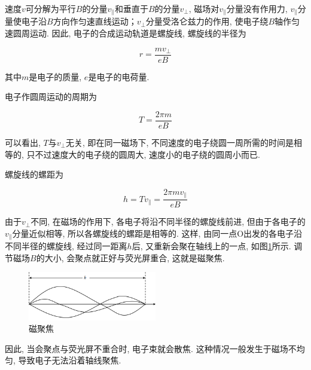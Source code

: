 \documentclass{article}
\begin{document}
速度$v$可分解为平行$B$的分量$v_{\parallel}$和垂直于$B$的分量$v_{\perp}$, 磁场对$v_{\parallel}$分量没有作用力, $v_{\parallel}$分量使电子沿$B$方向作匀速直线运动；$v_{\perp}$分量受洛仑兹力的作用, 使电子绕$B$轴作匀速圆周运动. 因此, 电子的合成运动轨道是螺旋线, 螺旋线的半径为

$$r = \frac{m v_{\perp}}{e B}$$

其中$m$是电子的质量, $e$是电子的电荷量.

电子作圆周运动的周期为

$$ T = \frac{2\pi m}{e B} $$

可以看出, $T$与$v_{\perp}$无关, 即在同一磁场下, 不同速度的电子绕圆一周所需的时间是相等的, 只不过速度大的电子绕的圆周大, 速度小的电子绕的圆周小而已.

螺旋线的螺距为

$$ h = T v_{\parallel} = \frac{2\pi m v_{\parallel}}{e B} $$

由于$v_{\perp}$不同, 在磁场的作用下, 各电子将沿不同半径的螺旋线前进, 但由于各电子的$v_{\parallel}$分量近似相等, 所以各螺旋线的螺距是相等的. 这样, 由同一点O出发的各电子沿不同半径的螺旋线, 经过同一距离$h$后, 又重新会聚在轴线上的一点, 如图\ref{fig:magnetic_focusing}所示. 调节磁场$B$的大小, 会聚点就正好与荧光屏重合, 这就是磁聚焦.

\begin{figure}[ht]
    \centering
    \includegraphics[width=0.5\textwidth]{img/magnetic_focusing.png}
    \caption{磁聚焦}
    \label{fig:magnetic_focusing}
\end{figure}

因此, 当会聚点与荧光屏不重合时, 电子束就会散焦. 这种情况一般发生于磁场不均匀, 导致电子无法沿着轴线聚焦.



\end{document}
